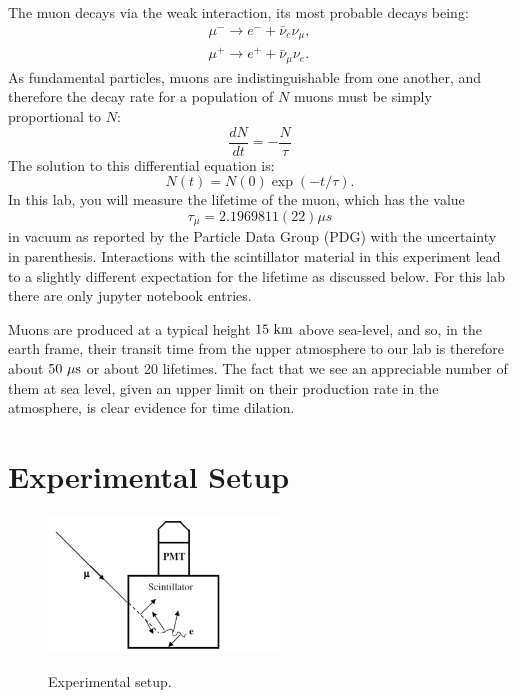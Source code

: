 The muon decays via the weak interaction, its most probable decays being:
\begin{eqnarray*}
\mu^- \to e^- + \bar{\nu}_e \nu_\mu,\\
\mu^+ \to e^+ + \bar{\nu}_\mu \nu_e.
\end{eqnarray*}
As fundamental particles, muons are indistinguishable from one
another, and therefore the decay rate for a population of $N$ muons
must be simply proportional to $N$:
\begin{displaymath}
\frac{dN}{dt} = -\frac{N}{\tau}
\end{displaymath}
The solution to this differential equation is:
\begin{displaymath}
N(t) = N(0) \exp(-t/\tau).
\end{displaymath}
In this lab, you will measure the lifetime of the muon, which has the value 
\begin{displaymath}
\tau_\mu = 2.1969811(22) \mu s
\end{displaymath}
in vacuum as reported by the Particle Data Group (PDG) with the
uncertainty in parenthesis.  Interactions with the scintillator
material in this experiment lead to a slightly different expectation
for the lifetime as discussed below. For this lab there are only jupyter notebook entries. 

Muons are produced at a typical height $15~\rm km$ above sea-level,
and so, in the earth frame, their transit time from the upper
atmosphere to our lab is therefore about $50~\rm \mu s$ or about 20
lifetimes.  The fact that we see an appreciable number of them at sea
level, given an upper limit on their production rate in the
atmosphere, is clear evidence for time dilation.

\section{Experimental Setup}

\begin{figure}[htbp]
\begin{center}
{\includegraphics[width=0.55\textwidth]{figs/labs/muon/setup.png}}\\
\end{center}
\caption{\label{fig:setup}  Experimental setup.}\end{figure}

